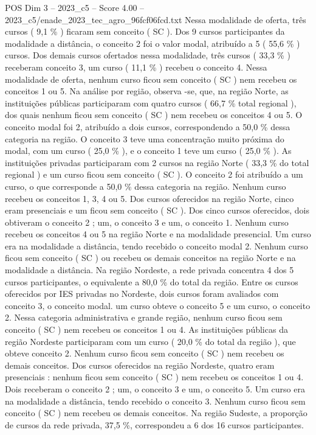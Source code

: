 \begin{textsample}{POS Dim 3 – 2023\_c5 – Score 4.00 – 2023\_c5/enade\_2023\_tec\_agro\_96fcf06fcd.txt}
Nessa modalidade de oferta, três cursos ( 9,1 \% ) ficaram sem conceito ( SC ).
Dos 9 cursos participantes da modalidade a distância, o conceito 2 foi o valor modal, atribuído a 5 ( 55,6 \% ) cursos.
Dos demais cursos ofertados nessa modalidade, três cursos ( 33,3 \% ) receberam conceito 3, um curso ( 11,1 \% ) recebeu o conceito 4.
Nessa modalidade de oferta, nenhum curso ficou sem conceito ( SC ) nem recebeu os conceitos 1 ou 5.
Na análise por região, observa -se, que, na região Norte, as instituições públicas participaram com quatro cursos ( 66,7 \% total regional ), dos quais nenhum ficou sem conceito ( SC ) nem recebeu os conceitos 4 ou 5.
O conceito modal foi 2, atribuído a dois cursos, correspondendo a 50,0 \% dessa categoria na região.
O conceito 3 teve uma concentração muito próxima do modal, com um curso ( 25,0 \% ), e o conceito 1 teve um curso ( 25,0 \% ).
As instituições privadas participaram com 2 cursos na região Norte ( 33,3 \% do total regional ) e um curso ficou sem conceito ( SC ).
O conceito 2 foi atribuído a um curso, o que corresponde a 50,0 \% dessa categoria na região.
Nenhum curso recebeu os conceitos 1, 3, 4 ou 5.
Dos cursos oferecidos na região Norte, cinco eram presenciais e um ficou sem conceito ( SC ).
Dos cinco cursos oferecidos, dois obtiveram o conceito 2 ; um, o conceito 3 e um, o conceito 1.
Nenhum curso recebeu os conceitos 4 ou 5 na região Norte e na modalidade presencial.
Um curso era na modalidade a distância, tendo recebido o conceito modal 2.
Nenhum curso ficou sem conceito ( SC ) ou recebeu os demais conceitos na região Norte e na modalidade a distância.
Na região Nordeste, a rede privada concentra 4 dos 5 cursos participantes, o equivalente a 80,0 \% do total da região.
Entre os cursos oferecidos por IES privadas no Nordeste, dois cursos foram avaliados com conceito 3, o conceito modal. um curso obteve o conceito 5 e um curso, o conceito 2.
Nessa categoria administrativa e grande região, nenhum curso ficou sem conceito ( SC ) nem recebeu os conceitos 1 ou 4.
As instituições públicas da região Nordeste participaram com um curso ( 20,0 \% do total da região ), que obteve conceito 2.
Nenhum curso ficou sem conceito ( SC ) nem recebeu os demais conceitos.
Dos cursos oferecidos na região Nordeste, quatro eram presenciais : nenhum ficou sem conceito ( SC ) nem recebeu os conceitos 1 ou 4.
Dois receberam o conceito 2 ; um, o conceito 3 e um, o conceito 5.
Um curso era na modalidade a distância, tendo recebido o conceito 3.
Nenhum curso ficou sem conceito ( SC ) nem recebeu os demais conceitos.
Na região Sudeste, a proporção de cursos da rede privada, 37,5 \%, correspondeu a 6 dos 16 cursos participantes.

\end{textsample}

